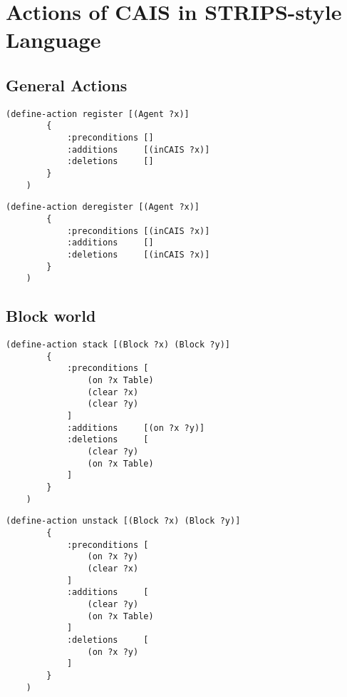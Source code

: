  
\appendix    %

\chapter{Actions of CAIS in STRIPS-style Language}\label{apdx:strips}

\section{General Actions}

\begin{lstlisting}[caption=register]
    (define-action register [(Agent ?x)]
        {
            :preconditions []
            :additions     [(inCAIS ?x)]
            :deletions     []
        }
    )
\end{lstlisting}

\begin{lstlisting}[caption=deregister]
    (define-action deregister [(Agent ?x)]
        {
            :preconditions [(inCAIS ?x)]
            :additions     []
            :deletions     [(inCAIS ?x)]
        }
    )
\end{lstlisting}

\section{Block world}

\begin{lstlisting}[caption=stack]
    (define-action stack [(Block ?x) (Block ?y)]
        {
            :preconditions [
                (on ?x Table)
                (clear ?x)
                (clear ?y)
            ]
            :additions     [(on ?x ?y)]
            :deletions     [
                (clear ?y)
                (on ?x Table)
            ]
        }
    )
\end{lstlisting}

\begin{lstlisting}[caption=unstack]
    (define-action unstack [(Block ?x) (Block ?y)]
        {
            :preconditions [
                (on ?x ?y)
                (clear ?x)
            ]
            :additions     [
                (clear ?y)
                (on ?x Table)
            ]
            :deletions     [
                (on ?x ?y)
            ]
        }
    )
\end{lstlisting}

